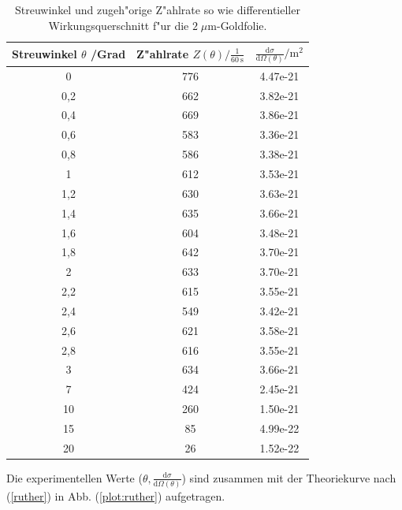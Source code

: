   \begin{table}
  \centering
  \begin{tabular}{c|c|c}

  Streuwinkel $\theta$ /Grad	&	Z"ahlrate $Z(\theta)/\frac{1}{\SI{60}{\second}}$	& $\frac{\text{d}\sigma}{\text{d}\Omega(\theta)}/\si{\meter \squared}$	 \\

  \toprule
 	0	   & 776 & 4.47e-21 \\
 	0,2	 & 662 & 3.82e-21 \\
 	0,4	 & 669 & 3.86e-21 \\
 	0,6	 & 583 & 3.36e-21 \\
  0,8  & 586 & 3.38e-21 \\
  1    & 612 & 3.53e-21 \\
  1,2  & 630 & 3.63e-21 \\
  1,4  & 635 & 3.66e-21 \\
  1,6  & 604 & 3.48e-21 \\
  1,8  & 642 & 3.70e-21 \\
  2    & 633 & 3.70e-21 \\
  2,2  & 615 & 3.55e-21 \\
  2,4  & 549 & 3.42e-21 \\
  2,6  & 621 & 3.58e-21 \\
  2,8  & 616 & 3.55e-21 \\
  3    & 634 & 3.66e-21 \\
  7    & 424 & 2.45e-21 \\
  10   & 260 & 1.50e-21 \\
  15   & 85  & 4.99e-22 \\
  20   & 26  & 1.52e-22 \\

 \bottomrule
  \end{tabular}
  \caption{Streuwinkel und zugeh"orige Z"ahlrate so wie differentieller Wirkungsquerschnitt f"ur die $2 \; \mu \text{m}$-Goldfolie.}
  \label{tab:ruther}
  \end{table}


  Die experimentellen Werte ($\theta,\frac{\text{d}\sigma}{\text{d}\Omega(\theta)}$) sind zusammen mit der Theoriekurve nach (\ref{ruther}) in Abb. (\ref{plot:ruther}) aufgetragen.

